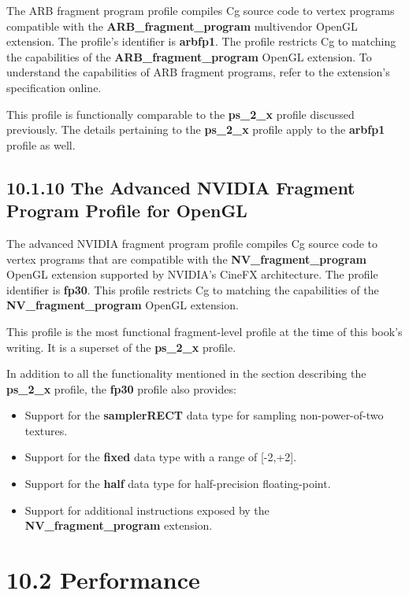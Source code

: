 \documentclass[../main.tex]{subfiles}
\begin{document}
The ARB fragment program profile compiles Cg source code to vertex programs compatible with the \textbf{ARB_fragment_program} multivendor OpenGL extension. The profile's identifier is \textbf{arbfp1}. The profile restricts Cg to matching the capabilities of the \textbf{ARB_fragment_program} OpenGL extension. To understand the capabilities of ARB fragment programs, refer to the extension's specification online.

This profile is functionally comparable to the \textbf{ps_2_x} profile discussed previously. The details pertaining to the \textbf{ps_2_x} profile apply to the \textbf{arbfp1} profile as well.

\subsection{10.1.10 The Advanced NVIDIA Fragment Program Profile for OpenGL}

The advanced NVIDIA fragment program profile compiles Cg source code to vertex programs that are compatible with the \textbf{NV_fragment_program} OpenGL extension supported by NVIDIA's CineFX architecture. The profile identifier is \textbf{fp30}. This profile restricts Cg to matching the capabilities of the \textbf{NV_fragment_program} OpenGL extension.

This profile is the most functional fragment-level profile at the time of this book's writing. It is a superset of the \textbf{ps_2_x} profile.

In addition to all the functionality mentioned in the section describing the \textbf{ps_2_x} profile, the \textbf{fp30} profile also provides:

\begin{itemize}
\item Support for the \textbf{samplerRECT} data type for sampling non-power-of-two textures.
\item Support for the \textbf{fixed} data type with a range of [-2,+2].
\item Support for the \textbf{half} data type for half-precision floating-point.
\item Support for additional instructions exposed by the \textbf{NV_fragment_program} extension.
\end{itemize}

\section{10.2 Performance}
\end{document}
